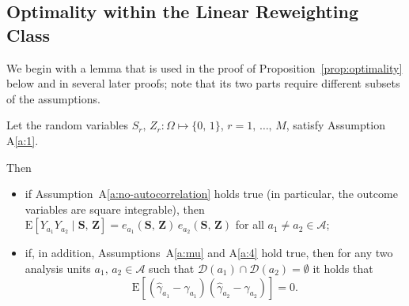 \documentclass[sigconf,nonacm]{acmart}
\newcounter{assumption}
\newcommand{\E}{\mathrm E}
\begin{document}
\subsection{Optimality within the Linear Reweighting Class}\label{app:optimality}

We begin with a lemma that is used in the proof of Proposition~\ref{prop:optimality} below and in several later proofs; note that its two parts require different subsets of the assumptions.

\begin{lemma}\label{lem:cov=0}
    Let the random variables $S_r,\,Z_r\colon\Omega\mapsto\{0,\,1\}$, $r=1,\,\ldots,\,M$, satisfy Assumption A\ref{a:1}.

    Then
    \begin{itemize}
        \item[\textup{(a)}] if Assumption~A\ref{a:no-autocorrelation} holds true (in particular, the outcome variables are square integrable), then
            $\E[Y_{a_1}Y_{a_2}\mid \mathbf{S},\,\mathbf{Z}] = e_{a_1}(\mathbf{S},\,\mathbf{Z})\,e_{a_2}(\mathbf{S},\,\mathbf{Z})$ for all $a_1\neq a_2\in\mathcal A$;
        \item[\textup{(b)}] if, in addition, Assumptions~A\ref{a:mu} and A\ref{a:4} hold true, then for any two analysis units $a_1,\,a_2\in\mathcal{A}$ such that $\mathcal D(a_1)\cap \mathcal D(a_2) = \emptyset$ it holds that
        \begin{equation}\label{eq:cov=0}
            \E[(\hat\gamma_{a_1} - \gamma_{a_1})(\hat\gamma_{a_2} - \gamma_{a_2})] = 0.
        \end{equation}
    \end{itemize}
\end{lemma}
\end{document}
